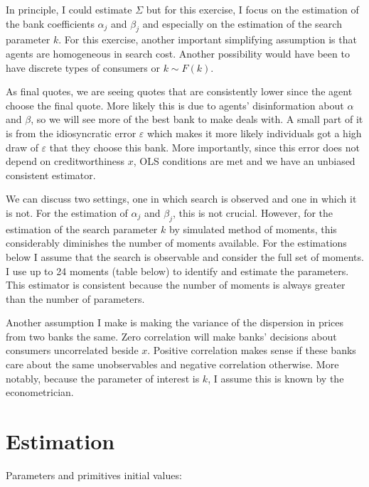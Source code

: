 \documentclass[12pt]{article}
\theoremstyle{definition}
\begin{document}
In principle, I could estimate $\Sigma$ but for this exercise, I focus on the estimation of the bank coefficients $\alpha_j$ and $\beta_j$ and especially on the estimation of the search parameter $k$. For this exercise, another important simplifying assumption is that agents are homogeneous in search cost. Another possibility would have been to have discrete types of consumers or $k \sim F(k)$.

As final quotes, we are seeing quotes that are consistently lower since the agent choose the final quote. More likely this is due to agents' disinformation about $\alpha$ and $\beta$, so we will see more of the best bank to make deals with. A small part of it is from the idiosyncratic error $\varepsilon$ which makes it more likely individuals got a high draw of $\varepsilon$ that they choose this bank. More importantly, since this error does not depend on creditworthiness $x$, OLS conditions are met and we have an unbiased consistent estimator.

We can discuss two settings, one in which search is observed and one in which it is not. For the estimation of $\alpha_j$ and $\beta_j$, this is not crucial. However, for the estimation of the search parameter $k$ by simulated method of moments, this considerably diminishes the number of moments available. For the estimations below I assume that the search is observable and consider the full set of moments. I use up to 24 moments (table below) to identify and estimate the parameters.  This estimator is consistent because the number of moments is always greater than the number of parameters.



Another assumption I make is making the variance of the dispersion in prices from two banks the same. Zero correlation will make banks' decisions about consumers uncorrelated beside $x$. Positive correlation makes sense if these banks care about the same unobservables and negative correlation otherwise. More notably, because the parameter of interest is $k$, I assume this is known by the econometrician.

\section{Estimation}

Parameters and primitives initial values:
\end{document}
